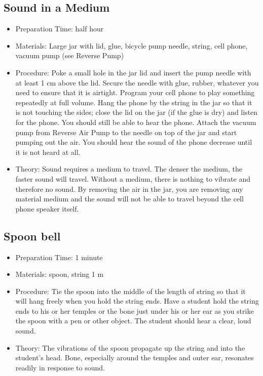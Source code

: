 \subsection{Sound in a Medium}
\begin{itemize}
\item{Preparation Time: half hour}
\item{Materials: Large jar with lid, glue, bicycle pump needle, string, cell phone, vacuum pump (see Reverse Pump)}
\item{Procedure: Poke a small hole in the jar lid and insert the pump needle with at least 1 cm above the lid. Secure the needle with glue, rubber, whatever you need to ensure that it is airtight. Program your cell phone to play something repeatedly at full volume. Hang the phone by the string in the jar so that it is not touching the sides; close the lid on the jar (if the glue is dry) and listen for the phone. You should still be able to hear the phone. Attach the vacuum pump from Reverse Air Pump to the needle on top of the jar and start pumping out the air. You should hear the sound of the phone decrease until it is not heard at all.}
\item{Theory: Sound requires a medium to travel. The denser the medium, the faster sound will travel. Without a medium, there is nothing to vibrate and therefore no sound. By removing the air in the jar, you are removing any material medium and the sound will not be able to travel beyond the cell phone speaker itself.}
\end{itemize}

\subsection{Spoon bell}
\begin{itemize}
\item{Preparation Time: 1 minute}
\item{Materials: spoon, string 1 m}
\item{Procedure: Tie the spoon into the middle of the length of string so that it will hang freely when you hold the string ends. Have a student hold the string ends to his or her temples or the bone just under his or her ear as you strike the spoon with a pen or other object. The student should hear a clear, loud sound.}
\item{Theory: The vibrations of the spoon propagate up the string and into the student’s head. Bone, especially around the temples and outer ear, resonates readily in response to sound.}
\end{itemize}

